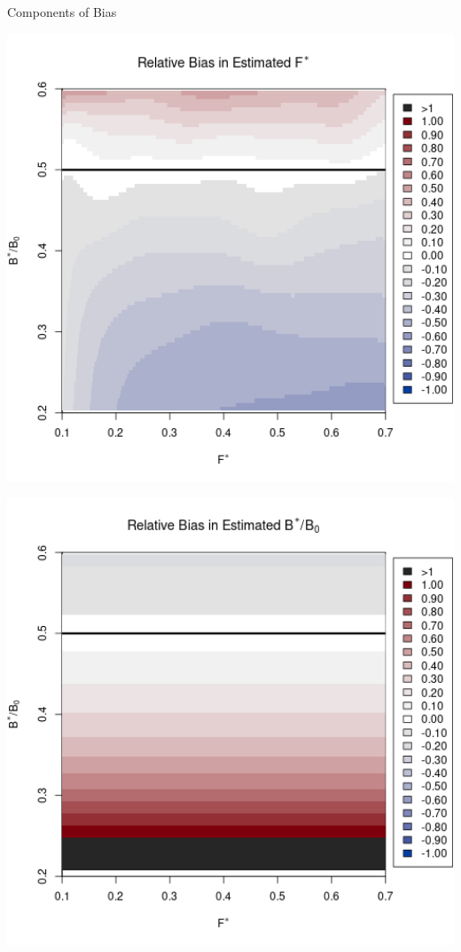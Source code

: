\documentclass[ xcolor = pdftex, dvipsnames, table ]{beamer}
\begin{document}
%
\begin{frame}{Components of Bias}
$~$\\
\vspace*{-0.5cm}
\hspace*{-1cm}
\begin{minipage}[h!]{0.49\textwidth}
\hspace*{0.25cm}
\includegraphics[width=1.1\textwidth]{../../.././nick/gpBias/fMSYRelBiasPellaFlatNoQ.png}
\end{minipage}
\begin{minipage}[h!]{0.49\textwidth}
\hspace*{1cm}
\includegraphics[width=1.1\textwidth]{../../.././nick/gpBias/zetaRelBiasPellaFlatNoQ.png}

\end{minipage}
\end{frame}
\end{document}
